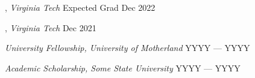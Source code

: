 
, \textit{Virginia Tech}	\hfill Expected Grad Dec 2022

, \textit{Virginia Tech} \hfill	Dec 2021

\textit{University Fellowship, University of Motherland} 	\hfill YYYY --- YYYY

\textit{Academic Scholarship, Some State University} \hfill	YYYY --- YYYY


